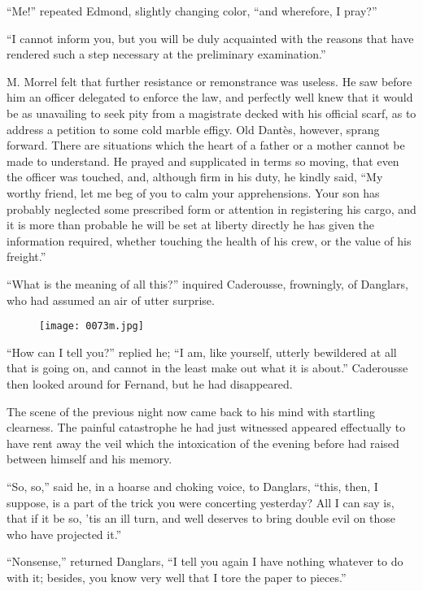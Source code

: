 “Me!” repeated Edmond, slightly changing color, “and wherefore, I
pray?”

“I cannot inform you, but you will be duly acquainted with the reasons
that have rendered such a step necessary at the preliminary
examination.”

M. Morrel felt that further resistance or remonstrance was useless. He
saw before him an officer delegated to enforce the law, and perfectly
well knew that it would be as unavailing to seek pity from a magistrate
decked with his official scarf, as to address a petition to some cold
marble effigy. Old Dantès, however, sprang forward. There are
situations which the heart of a father or a mother cannot be made to
understand. He prayed and supplicated in terms so moving, that even the
officer was touched, and, although firm in his duty, he kindly said,
“My worthy friend, let me beg of you to calm your apprehensions. Your
son has probably neglected some prescribed form or attention in
registering his cargo, and it is more than probable he will be set at
liberty directly he has given the information required, whether
touching the health of his crew, or the value of his freight.”

“What is the meaning of all this?” inquired Caderousse, frowningly, of
Danglars, who had assumed an air of utter surprise.

\begin{figure}[h]
\texttt{[image: 0073m.jpg]}
\end{figure}

“How can I tell you?” replied he; “I am, like yourself, utterly
bewildered at all that is going on, and cannot in the least make out
what it is about.” Caderousse then looked around for Fernand, but he
had disappeared.

The scene of the previous night now came back to his mind with
startling clearness. The painful catastrophe he had just witnessed
appeared effectually to have rent away the veil which the intoxication
of the evening before had raised between himself and his memory.

“So, so,” said he, in a hoarse and choking voice, to Danglars, “this,
then, I suppose, is a part of the trick you were concerting yesterday?
All I can say is, that if it be so, ’tis an ill turn, and well deserves
to bring double evil on those who have projected it.”

“Nonsense,” returned Danglars, “I tell you again I have nothing
whatever to do with it; besides, you know very well that I tore the
paper to pieces.”

